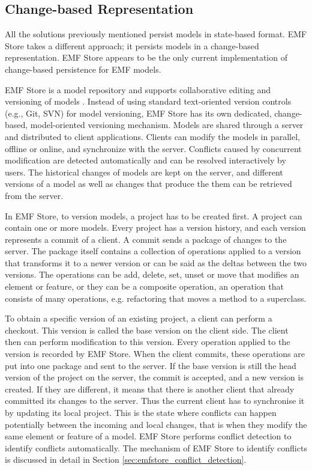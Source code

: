 \subsection{Change-based Representation}
\label{sec:change_based_representation}
All the solutions previously mentioned persist models in state-based format. EMF Store \cite{koegel2010emfstore} takes a different approach; it persists models in a change-based representation. EMF Store appears to be the only current implementation of change-based persistence for EMF models.

EMF Store is a model repository and supports collaborative editing and versioning of models \cite{emfstore2019what}. Instead of using standard text-oriented version controls (e.g., Git, SVN) for model versioning, EMF Store has its own dedicated, change-based, model-oriented versioning mechanism. Models are shared through a server and distributed to client applications. Clients can modify the models in parallel, offline or online, and synchronize with the server. Conflicts caused by concurrent modification are detected automatically and can be resolved interactively by users. The historical changes of models are kept on the server, and different versions of a model as well as changes that produce the them can be retrieved from the server. 

In EMF Store, to version models, a project has to be created first. A project can contain one or more models. Every project has a version history, and each version represents a commit of a client. A commit sends a package of changes to the server. The package itself contains a collection of operations applied to a version that transforms it to a newer version or can be said as the deltas between the two versions. The operations can be add, delete, set, unset or move that modifies an element or feature, or they can be a composite operation, an operation that consists of many operations, e.g. refactoring that moves a method to a superclass.

To obtain a specific version of an existing project, a client can perform a checkout. This version is called the base version on the client side. The client then can perform modification to this version. Every operation applied to the version is recorded by EMF Store. When the client commits, these operations are put into one package and sent to the server. If the base version is still the head version of the project on the server, the commit is accepted, and a new version is created. If they are different, it means that there is another client that already committed its changes to the server. Thus the current client has to synchronise it by updating its local project. This is the state where conflicts can happen potentially between the incoming and local changes, that is when they modify the same element or feature of a model. EMF Store performs conflict detection to identify conflicts automatically. The mechanism of EMF Store to identify conflicts is discussed in detail in Section \ref{sec:emfstore_conflict_detection}.

